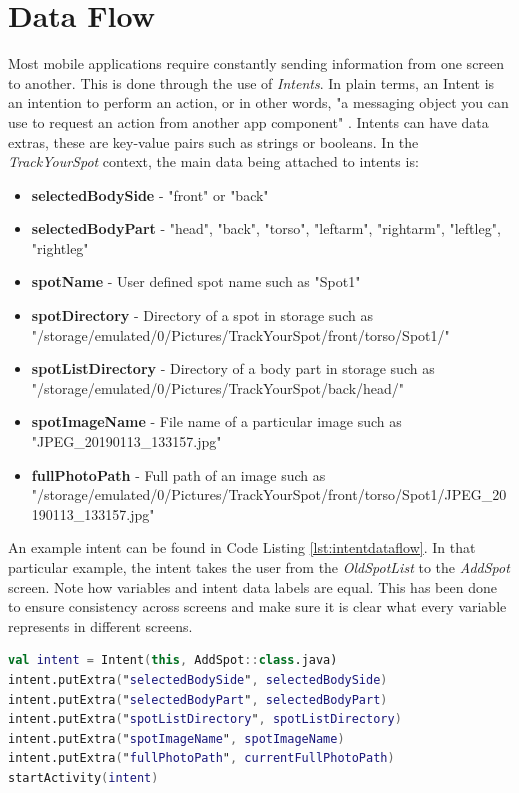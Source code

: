 \section{Data Flow}
Most mobile applications require constantly sending information from one screen to another. This is done through the use of \emph{Intents}. In plain terms, an Intent is an intention to perform an action, or in other words, "a messaging object you can use to request an action from another app component" \cite{intents}. Intents can have data extras, these are key-value pairs such as strings or booleans. In the \emph{TrackYourSpot} context, the main data being attached to intents is:
\begin{itemize}
    \item \textbf{selectedBodySide} - "front" or "back"
    \item \textbf{selectedBodyPart} - "head", "back", "torso", "leftarm", "rightarm", "leftleg", "rightleg"
    \item \textbf{spotName} - User defined spot name such as "Spot1"
    \item \textbf{spotDirectory} - Directory of a spot in storage such as "/storage/emulated/0/Pictures/TrackYourSpot/front/torso/Spot1/"
    \item \textbf{spotListDirectory} - Directory of a body part in storage such as "/storage/emulated/0/Pictures/TrackYourSpot/back/head/"
    \item \textbf{spotImageName} - File name of a particular image such as "JPEG\_20190113\_133157.jpg"
    \item \textbf{fullPhotoPath} - Full path of an image such as "/storage/emulated/0/Pictures/TrackYourSpot/front/torso/Spot1/JPEG\_20190113\_133157.jpg"
\end{itemize}
An example intent can be found in Code Listing \ref{lst:intentdataflow}. In that particular example, the intent takes the user from the \emph{OldSpotList} to the \emph{AddSpot} screen. Note how variables and intent data labels are equal. This has been done to ensure consistency across screens and make sure it is clear what every variable represents in different screens.

\begin{lstlisting}[caption={Intent Dataflow for the \emph{AddSpot class}}, 
label={lst:intentdataflow}, language=Kotlin]
val intent = Intent(this, AddSpot::class.java)
intent.putExtra("selectedBodySide", selectedBodySide)
intent.putExtra("selectedBodyPart", selectedBodyPart)
intent.putExtra("spotListDirectory", spotListDirectory)
intent.putExtra("spotImageName", spotImageName)
intent.putExtra("fullPhotoPath", currentFullPhotoPath)
startActivity(intent)
\end{lstlisting}
